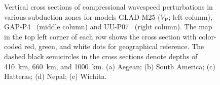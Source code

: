 \documentclass[extra,mreferee]{gji}
\begin{document}
\begin{figure}[ht]
    \centering
    \\[-1pt]
    \\[-1pt]
    \\[-1pt]
    \\[-1pt]
    \\[-1pt]
    \caption{Vertical cross sections of compressional wavespeed perturbations in various subduction zones
    for models GLAD-M25 ($V_\textrm{P}$; left column), GAP-P4~\citep{fukao2013subducted} (middle column) and UU-P07~\citep{van2018atlas} (right column).
    The map in the top left corner of each row shows the cross section with color-coded red, green, and white dots for geographical reference.
    The dashed black semicircles in the cross sections denote depths of 410~km, 660~km, and 1000~km.
    (a) Aegean; (b) South America; (c) Hatteras; (d) Nepal; (e)  Wichita.}
    \label{fig:subd}
\end{figure}
\end{document}
